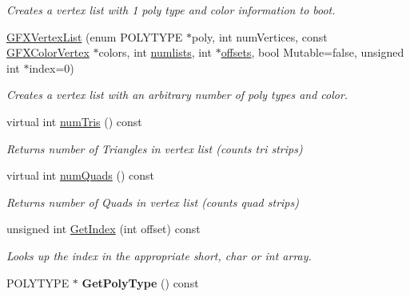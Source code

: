 \begin{DoxyCompactItemize}
\begin{DoxyCompactList}\small\item\em Creates a vertex list with 1 poly type and color information to boot. \end{DoxyCompactList}\item 
\hyperlink{classGFXVertexList_a0cf5dcc57c95a7d3823f03be44384602}{G\+F\+X\+Vertex\+List} (enum P\+O\+L\+Y\+T\+Y\+PE $\ast$poly, int num\+Vertices, const \hyperlink{structGFXColorVertex}{G\+F\+X\+Color\+Vertex} $\ast$colors, int \hyperlink{classGFXVertexList_a50b552e54f117f7456f3cb618c076190}{numlists}, int $\ast$\hyperlink{classGFXVertexList_a0310e1bd4dbc7bfb1240b200368ce8c9}{offsets}, bool Mutable=false, unsigned int $\ast$index=0)\hypertarget{classGFXVertexList_a0cf5dcc57c95a7d3823f03be44384602}{}\label{classGFXVertexList_a0cf5dcc57c95a7d3823f03be44384602}

\begin{DoxyCompactList}\small\item\em Creates a vertex list with an arbitrary number of poly types and color. \end{DoxyCompactList}\item 
virtual int \hyperlink{classGFXVertexList_af0ca7d06410f649c6d1d506121c4f6da}{num\+Tris} () const \hypertarget{classGFXVertexList_af0ca7d06410f649c6d1d506121c4f6da}{}\label{classGFXVertexList_af0ca7d06410f649c6d1d506121c4f6da}

\begin{DoxyCompactList}\small\item\em Returns number of Triangles in vertex list (counts tri strips) \end{DoxyCompactList}\item 
virtual int \hyperlink{classGFXVertexList_a1ccb94d8563c3ba9f041c42449af9f39}{num\+Quads} () const \hypertarget{classGFXVertexList_a1ccb94d8563c3ba9f041c42449af9f39}{}\label{classGFXVertexList_a1ccb94d8563c3ba9f041c42449af9f39}

\begin{DoxyCompactList}\small\item\em Returns number of Quads in vertex list (counts quad strips) \end{DoxyCompactList}\item 
unsigned int \hyperlink{classGFXVertexList_adab1c9a190a15884b699aef9d5fc22ea}{Get\+Index} (int offset) const \hypertarget{classGFXVertexList_adab1c9a190a15884b699aef9d5fc22ea}{}\label{classGFXVertexList_adab1c9a190a15884b699aef9d5fc22ea}

\begin{DoxyCompactList}\small\item\em Looks up the index in the appropriate short, char or int array. \end{DoxyCompactList}\item 
P\+O\+L\+Y\+T\+Y\+PE $\ast$ {\bfseries Get\+Poly\+Type} () const \hypertarget{classGFXVertexList_a497d36c60d6297b7e3801568c40145fc}{}\label{classGFXVertexList_a497d36c60d6297b7e3801568c40145fc}


\end{DoxyCompactItemize}
